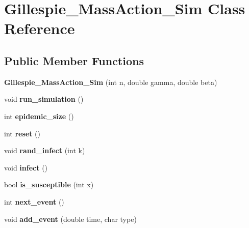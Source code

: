 \hypertarget{classGillespie__MassAction__Sim}{}\section{Gillespie\+\_\+\+Mass\+Action\+\_\+\+Sim Class Reference}
\label{classGillespie__MassAction__Sim}
\subsection*{Public Member Functions}
\begin{DoxyCompactItemize}
\item 
\hypertarget{classGillespie__MassAction__Sim_a9b4b53ea5569ec52d0e23dc2f7884cbe}{}{\bfseries Gillespie\+\_\+\+Mass\+Action\+\_\+\+Sim} (int n, double gamma, double beta)\label{classGillespie__MassAction__Sim_a9b4b53ea5569ec52d0e23dc2f7884cbe}

\item 
\hypertarget{classGillespie__MassAction__Sim_a6b570cc02daca342745fb1611aea90c9}{}void {\bfseries run\+\_\+simulation} ()\label{classGillespie__MassAction__Sim_a6b570cc02daca342745fb1611aea90c9}

\item 
\hypertarget{classGillespie__MassAction__Sim_a61d7cca8bfcaf0d97d03e4f4e8b35fc7}{}int {\bfseries epidemic\+\_\+size} ()\label{classGillespie__MassAction__Sim_a61d7cca8bfcaf0d97d03e4f4e8b35fc7}

\item 
\hypertarget{classGillespie__MassAction__Sim_a77c0557feada66744e3f11d941d90562}{}int {\bfseries reset} ()\label{classGillespie__MassAction__Sim_a77c0557feada66744e3f11d941d90562}

\item 
\hypertarget{classGillespie__MassAction__Sim_a41293b67dfb394ec78d26af72d34a49c}{}void {\bfseries rand\+\_\+infect} (int k)\label{classGillespie__MassAction__Sim_a41293b67dfb394ec78d26af72d34a49c}

\item 
\hypertarget{classGillespie__MassAction__Sim_ad043112abcf8ba09f3a5704acf38909b}{}void {\bfseries infect} ()\label{classGillespie__MassAction__Sim_ad043112abcf8ba09f3a5704acf38909b}

\item 
\hypertarget{classGillespie__MassAction__Sim_ac457e50469f3152894119b160b9b7986}{}bool {\bfseries is\+\_\+susceptible} (int x)\label{classGillespie__MassAction__Sim_ac457e50469f3152894119b160b9b7986}

\item 
\hypertarget{classGillespie__MassAction__Sim_aa0dcbe9596ee241c0821d1d138d3650d}{}int {\bfseries next\+\_\+event} ()\label{classGillespie__MassAction__Sim_aa0dcbe9596ee241c0821d1d138d3650d}

\item 
\hypertarget{classGillespie__MassAction__Sim_ad2dc4d3125dfa1e3c4f9a752b6a7f368}{}void {\bfseries add\+\_\+event} (double time, char type)\label{classGillespie__MassAction__Sim_ad2dc4d3125dfa1e3c4f9a752b6a7f368}

\end{DoxyCompactItemize}
